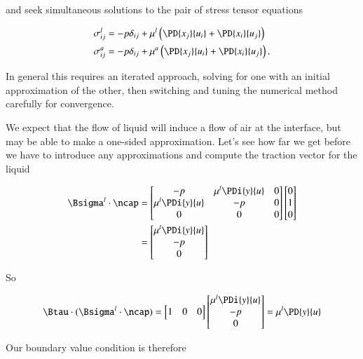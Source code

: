 and seek simultaneous solutions to the pair of stress tensor equations

\begin{align}\label{eqn:continuumL12:210}
\sigma_{ij}^l
&= - p \delta_{ij} + \mu^l \left(
\PD{x_j}{u_i} +
\PD{x_i}{u_j}
\right) \\
\sigma_{ij}^a
&= - p \delta_{ij} + \mu^a \left(
\PD{x_j}{u_i} +
\PD{x_i}{u_j}
\right).
\end{align}

In general this requires an iterated approach, solving for one with an initial approximation of the other, then switching and tuning the numerical method carefully for convergence.

We expect that the flow of liquid will induce a flow of air at the interface, but may be able to make a one-sided approximation.  Let's see how far we get before we have to introduce any approximations and compute the traction vector for the liquid

\begin{align*}
\Bsigma^l \cdot \ncap &=
\begin{bmatrix}
-p & \mu^l \PDi{y}{u} & 0 \\
\mu^l \PDi{y}{u} & -p & 0 \\
0 & 0 & 0
\end{bmatrix}
\begin{bmatrix}
0 \\
1 \\
0
\end{bmatrix} \\
&=
\begin{bmatrix}
\mu^l \PDi{y}{u} \\
-p \\
0
\end{bmatrix}
\end{align*}

So

\begin{equation}\label{eqn:continuumL12:230}
\Btau \cdot (\Bsigma^l \cdot \ncap)
=
\begin{bmatrix}
1 & 0 & 0
\end{bmatrix}
\begin{bmatrix}
\mu^l \PDi{y}{u} \\
-p \\
0
\end{bmatrix}
=
\mu^l \PD{y}{u}
\end{equation}

Our boundary value condition is therefore

